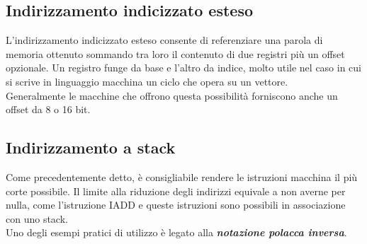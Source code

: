 \documentclass[12pt]{report}
\begin{document}
		\subsection{Indirizzamento indicizzato esteso}
		L'indirizzamento indicizzato esteso consente di referenziare una parola di memoria ottenuto sommando tra loro il contenuto di due registri più un offset opzionale. Un registro funge da base e l'altro da indice, molto utile nel caso in cui si scrive in linguaggio macchina un ciclo che opera su un vettore. \\
		Generalmente le macchine che offrono questa possibilità forniscono anche un offset da 8 o 16 bit.
		\subsection{Indirizzamento a stack}
		Come precedentemente detto, è consigliabile rendere le istruzioni macchina il più corte possibile. Il limite alla riduzione degli indirizzi equivale a non averne per nulla, come l'istruzione IADD e queste istruzioni sono possibili in associazione con uno stack.\\
		Uno degli esempi pratici di utilizzo è legato alla \textbf{\textit{notazione polacca inversa}}.
\end{document}
